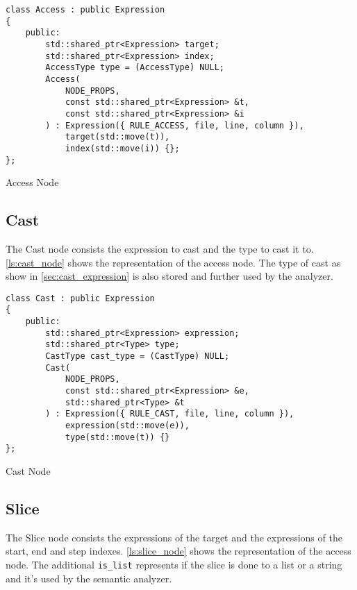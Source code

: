 \begin{listing}[H]
\begin{verbatim}
class Access : public Expression
{
    public:
        std::shared_ptr<Expression> target;
        std::shared_ptr<Expression> index;
        AccessType type = (AccessType) NULL;
        Access(
            NODE_PROPS,
            const std::shared_ptr<Expression> &t,
            const std::shared_ptr<Expression> &i
        ) : Expression({ RULE_ACCESS, file, line, column }),
            target(std::move(t)),
            index(std::move(i)) {};
};
\end{verbatim}
\caption{Access Node}
\label{ls:access_node}
\end{listing}

\subsection{Cast}

The Cast node consists the expression to cast and the type to cast it to.
\autoref{ls:cast_node} shows the representation of the access node.
The type of cast as show in \autoref{sec:cast_expression} is also stored and further used by the analyzer.

\begin{listing}[H]
\begin{verbatim}
class Cast : public Expression
{
    public:
        std::shared_ptr<Expression> expression;
        std::shared_ptr<Type> type;
        CastType cast_type = (CastType) NULL;
        Cast(
            NODE_PROPS,
            const std::shared_ptr<Expression> &e,
            std::shared_ptr<Type> &t
        ) : Expression({ RULE_CAST, file, line, column }),
            expression(std::move(e)),
            type(std::move(t)) {}
};
\end{verbatim}
\caption{Cast Node}
\label{ls:cast_node}
\end{listing}

\subsection{Slice}

The Slice node consists the expressions of the target and the expressions of the start, end and step indexes.
\autoref{ls:slice_node} shows the representation of the access node.
The additional \texttt{is\_list} represents if the slice is done to a list or a string and it's used by the semantic analyzer.

